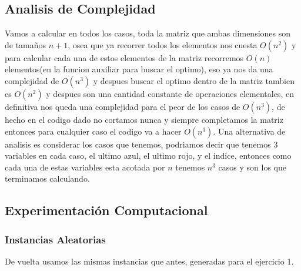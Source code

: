 \subsection*{Analisis de Complejidad}
Vamos a calcular en todos los casos, toda la matriz que ambas dimensiones son de tamaños $n+1$, osea que ya recorrer todos los elementos nos cuesta $O(n^2)$ y para calcular cada una de estos elementos de la matriz recorremos $O(n)$ elementos(en la funcion auxiliar para buscar el optimo), eso ya nos da una complejidad de $O(n^3)$ y despues buscar el optimo dentro de la matriz tambien es $O(n^2)$ y despues son una cantidad constante de operaciones elementales, en definitiva nos queda una complejidad para el peor de los casos de $O(n^3)$, de hecho en el codigo dado no cortamos nunca y siempre completamos la matriz entonces para cualquier caso el codigo va a hacer $O(n^3)$. Una alternativa de analisis es considerar los casos que tenemos, podriamos decir que tenemos 3 variables en cada caso, el ultimo azul, el ultimo rojo, y el indice, entonces como cada una de estas variables esta acotada por $n$ tenemos $n^3$ casos y son los que terminamos calculando.


\subsection*{Experimentación Computacional}
\subsubsection*{Instancias Aleatorias}
De vuelta usamos las mismas instancias que antes, generadas para el ejercicio 1.


